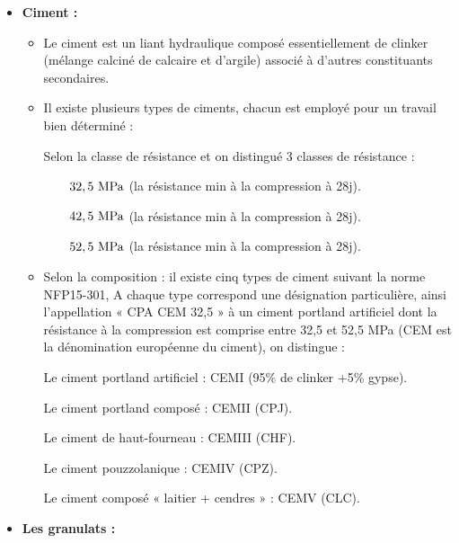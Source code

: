 \documentclass[12pt,a4paper]{report}
\numberwithin{equation}{section}
\begin{document}
	\begin{itemize}
		\item \textbf{Ciment :}
		
		\begin{itemize}
			\item  Le ciment est un liant hydraulique composé essentiellement de clinker (mélange calciné de calcaire et d'argile) associé à d’autres constituants secondaires.
			
			\item Il existe plusieurs types de ciments, chacun est employé pour un travail bien déterminé :
			
			\subsubitem Selon la classe de résistance et on distingué 3 classes de résistance : 
			
			\subsubitem $\qquad32,5\mpa$ (la résistance min à la compression à 28j).
			
			\subsubitem $\qquad42,5\mpa$ (la résistance min à la compression à 28j).
			
			\subsubitem $\qquad52,5\mpa$ (la résistance min à la compression à 28j).
			
			
			\item Selon la composition : il existe cinq types de ciment suivant la norme NFP15-301, A chaque type correspond une désignation particulière, ainsi l'appellation « CPA CEM 32,5 » à un ciment portland artificiel dont la résistance à la compression est comprise entre 32,5 et 52,5 MPa (CEM est la dénomination européenne du ciment),
			on distingue :
			
			\subitem Le ciment portland artificiel : \hspace{1cm} CEMI (95\% de clinker +5\% gypse).
			
			\subitem Le ciment portland composé : \hspace{1cm} CEMII (CPJ).
			
			\subitem Le ciment de haut-fourneau : \hspace{1cm} CEMIII (CHF).
			
			\subitem Le ciment pouzzolanique : \hspace{1cm} CEMIV (CPZ).
			
			\subitem Le ciment composé « laitier + cendres » : \hspace{1cm} CEMV (CLC).
			
		\end{itemize}
		
		
		\item \textbf{Les granulats :} 
		

\end{itemize}
\end{document}
